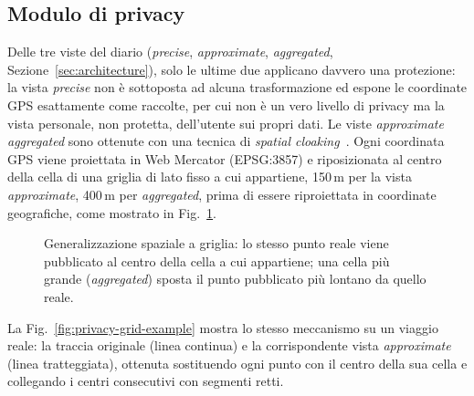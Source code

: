 \documentclass[conference]{IEEEtran}
\begin{document}
\subsection{Modulo di privacy}

Delle tre viste del diario (\emph{precise}, \emph{approximate},
\emph{aggregated}, Sezione~\ref{sec:architecture}), solo le ultime due
applicano davvero una protezione: la vista \emph{precise} non è
sottoposta ad alcuna trasformazione ed espone le coordinate GPS
esattamente come raccolte, per cui non è un vero livello di privacy ma
la vista personale, non protetta, dell'utente sui propri dati. 
Le viste \emph{approximate} 
\emph{aggregated} sono ottenute con una tecnica di \emph{spatial cloaking}~\cite{gruteser2003cloaking}.
Ogni coordinata GPS viene proiettata in Web Mercator (EPSG:3857) e riposizionata al
centro della cella di una griglia di lato fisso a cui appartiene,
150\,m per la vista \emph{approximate}, 400\,m per
\emph{aggregated}, prima di essere riproiettata in coordinate
geografiche, come mostrato in Fig.~\ref{fig:privacy-grid}.

\begin{figure}[htbp]
\centering
{}
\caption{Generalizzazione spaziale a griglia: lo stesso punto reale
viene pubblicato al centro della cella a cui appartiene; una cella più
grande (\emph{aggregated}) sposta il punto pubblicato più lontano da
quello reale.}
\label{fig:privacy-grid}
\end{figure}

La Fig.~\ref{fig:privacy-grid-example} mostra lo stesso meccanismo su
un viaggio reale: la traccia originale (linea continua) e la
corrispondente vista \emph{approximate} (linea tratteggiata), ottenuta
sostituendo ogni punto con il centro della sua cella e collegando i
centri consecutivi con segmenti retti.
\end{document}
